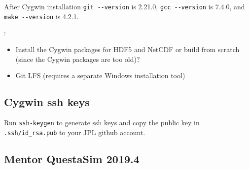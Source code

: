 \documentclass[10pt,twoside]{article}
\begin{document}
After Cygwin installation \verb+git --version+ is 2.21.0, \verb+gcc --version+ is
7.4.0, and \verb+make --version+ is 4.2.1.

\vskip5mm
:
\begin{itemize}
\item Install the Cygwin packages for HDF5 and NetCDF or build from scratch
(since the Cygwin packages are too old)?
\item Git LFS (requires a separate Windows installation tool)
\end{itemize}

\subsection{Cygwin ssh keys}

Run \verb+ssh-keygen+ to generate ssh keys and copy the public
key in \verb+.ssh/id_rsa.pub+ to your JPL github account.

\clearpage
\subsection{Mentor QuestaSim 2019.4}
\end{document}
